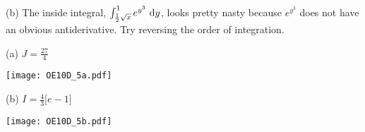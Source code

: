 \begin{hint}
(b) The inside integral, $\int_{\frac{1}{2}\sqrt{x}}^1  e^{y^3}\ \dee{y}$, 
looks pretty nasty because $e^{y^3}$ does not have an obvious antiderivative. 
Try reversing the order of integration. 
\end{hint}

\begin{answer}
(a) $J=\frac{27}{4}$

\begin{center}
     \texttt{[image: OE10D\_5a.pdf]}
\end{center}


(b) $I=\frac{4}{3}\big[e-1\big]$

\begin{center}
     \texttt{[image: OE10D\_5b.pdf]}
\end{center}
\end{answer}


